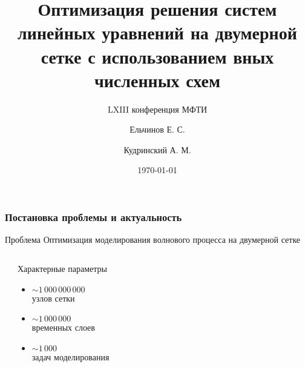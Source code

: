 \documentclass[presentation,18pt]{beamer}
\begin{document}
\title[Оптимизация LRnLA]{Оптимизация решения систем линейных уравнений 
	на двумерной сетке с использованием вных численных схем}
\subtitle{LXIII конференция МФТИ}
\author[Ельчинов]{Ельчинов Е. С. \and
									Кудринский А. М.}
\date{\today}

\begin{frame}
	\label{titular}
	\titlepage
\end{frame}

\begin{frame}[t]
	\label{introductory}
	\frametitle{Постановка проблемы и актуальность}

	\begin{block}{Проблема}
		Оптимизация моделирования волнового процесса на двумерной сетке
	\end{block}

	\begin{columns}

		\begin{alertblock}{}
			\vspace{120pt}
		\end{alertblock}

		\begin{block}{Характерные параметры}
			\begin{itemize}
				\vspace{1ex}
				\item{$\sim 1\,000\,000\,000$ \\ узлов сетки}

				\vspace{1ex}
				\item{$\sim 1\,000\,000$ \\ временных слоев}

				\vspace{1ex}
				\item{$\sim 1\,000$ \\ задач моделирования}
			\end{itemize}
		\end{block}

	\end{columns}
\end{frame}
\end{document}
